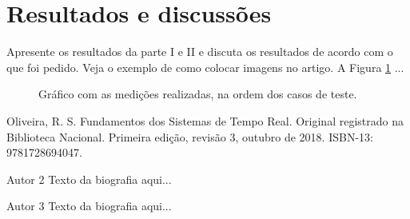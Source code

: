 \documentclass[journal]{IEEEtran}
\begin{document}
\section{Resultados e discussões}

Apresente os resultados da parte I e II e discuta os resultados de acordo com o que foi pedido. Veja o exemplo de como colocar imagens no artigo. A Figura \ref{fig1} ...

	\begin{figure}[h]
	\centering
	\caption{Gráfico com as medições realizadas, na ordem dos casos de teste.}
	\label{fig1}
\end{figure}


\ifCLASSOPTIONcaptionsoff
  \newpage
\fi

\begin{thebibliography}{1}

Oliveira, R. S. Fundamentos dos Sistemas de Tempo Real. Original registrado na Biblioteca Nacional. Primeira edição, revisão 3, outubro de 2018. ISBN-13: 9781728694047.

\end{thebibliography}


\begin{IEEEbiographynophoto}{Autor 2}
Texto da biografia aqui...
\end{IEEEbiographynophoto}


\begin{IEEEbiographynophoto}{Autor 3}
Texto da biografia aqui...
\end{IEEEbiographynophoto}
\end{document}

